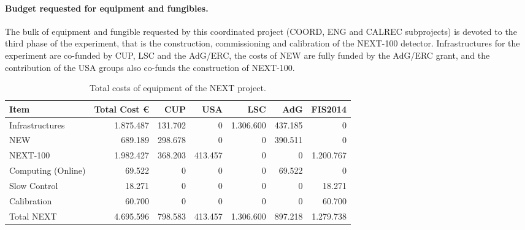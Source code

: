 \paragraph{Budget requested for equipment and fungibles.}

The bulk of equipment and fungible requested by this coordinated project (COORD, ENG and CALREC subprojects) is devoted to the third phase of the experiment, that is the construction, commissioning and calibration of the NEXT-100 detector. 
 Infrastructures for the experiment are co-funded by CUP, LSC and the AdG/ERC, the costs of NEW are fully funded by the AdG/ERC grant, and the contribution of the USA groups also co-funds the construction of NEXT-100. 

\begin{table}[h!]
\begin{center}
\begin{tabular}{|l|r|r|r|r|r|r|}
\hline
 Item              & Total Cost \euro & CUP	&USA &	LSC & AdG &	FIS2014 \\
 \hline
Infrastructures    & 1.875.487 & 131.702 & 	 0 & 1.306.600 & 437.185 &	   0 \\
NEW                &   689.189 & 298.678 & 	 0 &	     0 & 390.511 &	   0 \\	
NEXT-100           & 1.982.427 & 368.203 & 413.457 &	     0 &       0 & 1.200.767 \\
Computing (Online) &    69.522 &       0 & 	 0 &	     0 &  69.522 &	   0 \\
Slow Control       &    18.271 &       0 &	 0 &	     0 &       0 &    18.271 \\
Calibration        &	60.700 &       0 &	 0 &	     0 &       0 &    60.700 \\
 \hline
Total  NEXT        & 4.695.596 & 798.583 & 413.457 & 1.306.600 & 897.218 & 1.279.738 \\
 \hline
\end{tabular}  
\caption{Total costs of equipment of the NEXT project.}
\label{tab.TCOSTS}
\end{center}
\end{table} 

